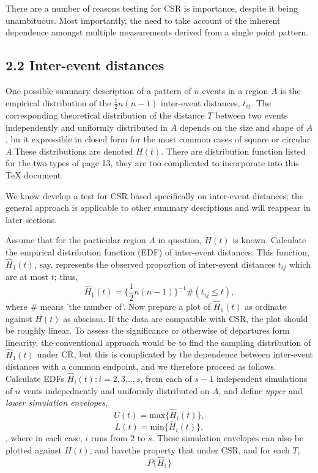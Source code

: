 \documentclass{article}
\begin{document}
There are a number of reasons testing for CSR is importance, despite it being unambituous. Most importantly, the need to take account of the inherent dependence amongst multiple measurements derived from a single point pattern. 
\subsection*{2.2 Inter-event distances}
One possible summary description of a pattern of $n$ events in a region $A$ is the empirical distribution of the $\frac{1}{2} n(n-1)$ inter-event distances, $t_{ij}$. The corresponding theoretical distribution of the distance $T$ between two events independently and uniformly distributed in $A$ depends on the size and shape of $A$, bu it expressible in closed form for the most common cases of square or circular $A$.These distributions are denoted $H(t)$.  There are distribution function listed for the two types of page 13, they are too complicated to incorporate into this TeX document. 

We know develop a test for CSR based specifically on inter-event distances; the general approach is applicable to other summary desciptions and will reappear in later sections. 

Assume that for the particular region $A$ in question, $H(t)$ is known. Calculate the empirical distribution function (EDF) of inter-event distances. This function, $\hat{H}_1(t)$, say, represents the observed proportion of inter-event distances $t_{ij} $ which are at most $t$; thus, $$\hat{H}_1(t) = \{\frac{1}{2}n(n-1)\}^{-1} \#(t_{ij}\leq t),$$ where $\#$ means 'the number of'. Now prepare a plot of $\hat{H}_1(t)$  as ordinate against $H(t)$ as abscissa. If the data are compatible with CSR, the plot should be roughly linear. To assess the significance or otherwise of departures form linearity, the conventional approach would be to find the sampling distribution of $\hat{H}_1(t)$ under CR, but this is complicated by the dependence between inter-event distances with a common endpoint, and we therefore proceed as follows. Calculate EDFs $\hat{H}_i(t): i = 2, 3 \dots, s$, from each of $s-1$ independent simulations of $n$ vents indepednently and uniformly distributed on $A$, and define {\it upper} and {\it lower simulation envelopes}, $$U(t) = \text{max}\{\hat{H}_i(t)\},$$ $$L(t) = \text{min}\{\hat{H}_i(t)\},$$, where in each case, $i$ runs from $2$ to $s$. These simulation envelopes can also be plotted against $H(t)$, and havethe property that under CSR, and for each $T$, $$P\{\hat{H}_1\}$$
\end{document}

